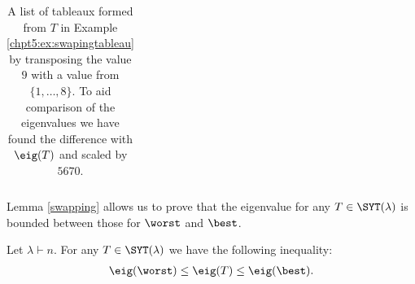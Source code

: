 \documentclass[11pt]{report}
\begin{document}
\begin{table}[H]
\begin{adjustbox}{width=\columnwidth,center}
\begin{tabular}{c|c|c|c|c|c|c|c|c}
			
			
			
			
			
		\end{tabular}
	\end{adjustbox}
	
	\caption[A list of tableaux formed from $T$ in Example \ref{chpt5:ex:swapingtableau} by transposing the value $9$ with a value from $\{1,\ldots, 8\}$]{A list of tableaux formed from $T$ in Example \ref{chpt5:ex:swapingtableau} by transposing the value $9$ with a value from $\{1,\ldots, 8\}$. To aid comparison of the eigenvalues we have found the difference with $\eig(T)$ and scaled by $5670$. }
	\label{table:eigenvalue3}
\end{table}




























































Lemma \ref{swapping} allows us to prove that the eigenvalue for any $T \in \SYT(\lambda)$ is bounded between those for $\worst$ and $\best$.

\begin{lemma}
	\label{seq}
	Let $\lambda\vdash n$.
	For any $T \in \SYT(\lambda)$ we have the following 
	inequality:
	\begin{eqnarray}
	\eig(\worst) \leq \eig(T) \leq 
	\eig(\best).
	\end{eqnarray}
\end{lemma}
\end{document}
